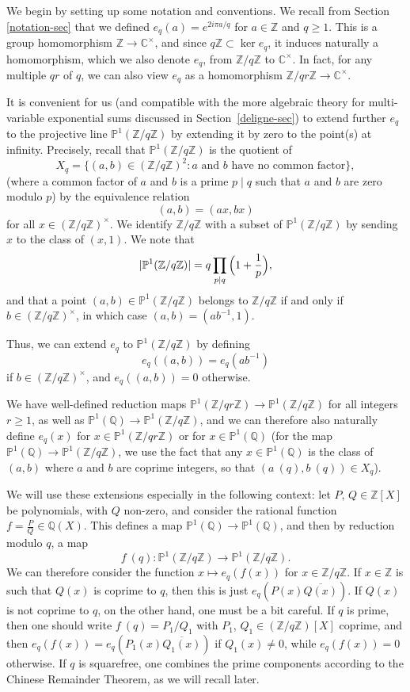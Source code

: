 \documentclass[12pt,a4paper,reqno]{amsart}
\numberwithin{equation}{section}
\theoremstyle{plain}
\theoremstyle{definition}
\newcommand\Z{\mathbb{Z}}
\newcommand\C{\mathbb{C}}
\newcommand\Q{\mathbb{Q}}
\renewcommand\P{\mathbb{P}}
\newcommand{\ra}{\rightarrow}
\begin{document}
We begin by setting up some notation and conventions. We recall from
Section \ref{notation-sec} that we defined $e_q(a)=e^{2i\pi a/q}$ for
$a\in\Z$ and $q\geq 1$. This is a group homomorphism $\Z\rightarrow
\C^{\times}$, and since $q\Z\subset \ker e_q$, it induces naturally a
homomorphism, which we also denote $e_q$, from $\Z/q\Z$ to
$\C^{\times}$. In fact, for any multiple $qr$ of $q$, we can also view
$e_q$ as a homomorphism $\Z/qr\Z\ra \C^{\times}$.
\par
It is convenient for us (and compatible with the more algebraic theory
for multi-variable exponential sums discussed in
Section~\ref{deligne-sec}) to extend further $e_q$ to the projective
line $\P^1(\Z/q\Z)$ by extending it by zero to the point(s) at
infinity. Precisely, recall that $\P^1(\Z/q\Z)$ is the quotient of
$$
X_q=\{(a,b)\in (\Z/q\Z)^{2}\colon a\text{ and } b\text{ have no common
  factor}\},
$$
(where a common factor of $a$ and $b$ is a prime $p\mid q$ such that
$a$ and $b$ are zero modulo $p$) by the equivalence relation
$$
(a,b)=(ax,bx)
$$
for all $x\in(\Z/q\Z)^{\times}$. We identify $\Z/q\Z$ with a subset
of $\P^1(\Z/q\Z)$ by sending $x$ to the class of $(x,1)$. We note that
$$
|\P^1(\Z/q\Z)|=q\prod_{p\mid q}{\Bigl(1+\frac{1}{p}\Bigr)},
$$
and that a point $(a,b)\in \P^1(\Z/q\Z)$ belongs to $\Z/q\Z$ if and
only if $b\in (\Z/q\Z)^{\times}$, in which case $(a,b)=(ab^{-1},1)$.
\par
Thus, we can extend $e_q$ to $\P^1(\Z/q\Z)$ by defining
$$
e_q((a,b))=e_q(ab^{-1})
$$
if $b\in (\Z/q\Z)^{\times}$, and $e_q((a,b))=0$ otherwise. 
\par
We have well-defined reduction maps $\P^1(\Z/qr\Z)\ra \P^1(\Z/q\Z)$
for all integers $r\geq 1$, as well as $\P^1(\Q)\ra \P^1(\Z/q\Z)$, and
we can therefore also naturally define $e_q(x)$ for $x\in
\P^1(\Z/qr\Z)$ or for $x\in \P^1(\Q)$ (for the map $\P^1(\Q)\ra
\P^1(\Z/q\Z)$, we use the fact that any $x\in \P^1(\Q)$ is the class
of $(a,b)$ where $a$ and $b$ are coprime integers, so that $(a\ (q),b\
(q))\in X_q$).
\par
We will use these extensions especially in the following context: let
$P$, $Q\in\Z[X]$ be polynomials, with $Q$ non-zero, and consider the
rational function $f=\frac{P}{Q}\in \Q(X)$. This defines a map $\P^1(\Q)\ra
\P^1(\Q)$, and then by reduction modulo $q$, a map
$$
f\ (q)\colon \P^1(\Z/q\Z)\ra \P^1(\Z/q\Z).
$$
We can therefore consider the function $x\mapsto e_q(f(x))$ for
$x\in\Z/q\Z$. If $x\in \Z$ is such that $Q(x)$ is coprime to $q$, then
this is just $e_q(P(x)\overline{Q(x)})$. If $Q(x)$ is not coprime to
$q$, on the other hand, one must be a bit careful. If $q$ is prime,
then one should write $f\ (q)=P_1/Q_1$ with $P_1$, $Q_1\in(\Z/q\Z)[X]$
coprime, and then $e_q(f(x))=e_q(P_1(x)\overline{Q_1(x)})$ if
$Q_1(x)\neq 0$, while $e_q(f(x))=0$ otherwise. If $q$ is squarefree,
one combines the prime components according to the Chinese Remainder
Theorem, as we will recall later.
\end{document}
